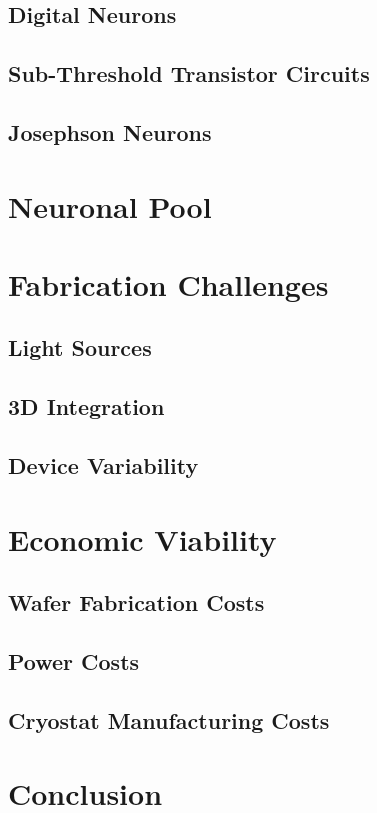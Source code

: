 \documentclass{article}
\begin{document}
\subsection{Digital Neurons}
\subsection{Sub-Threshold Transistor Circuits}
\subsection{Josephson Neurons}
\section{Neuronal Pool}
\section{Fabrication Challenges}
\subsection{Light Sources}
\subsection{3D Integration}
\subsection{Device Variability}
\section{Economic Viability}
\subsection{Wafer Fabrication Costs}
\subsection{Power Costs}
\subsection{Cryostat Manufacturing Costs}
\section{Conclusion}
\end{document}
